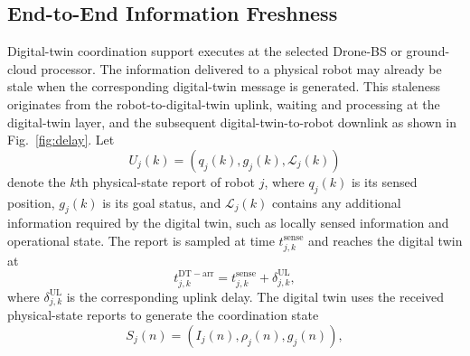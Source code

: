 \IfFileExists{IEEEtran.cls}{\documentclass[conference]{IEEEtran}}{\documentclass[10pt,twocolumn]{article}}
\begin{document}
\subsection{End-to-End Information Freshness} \label{subsec:end_to_end_information_freshness} Digital-twin coordination support executes at the selected Drone-BS or ground-cloud processor. The information delivered to a physical robot may already be stale when the corresponding digital-twin message is generated. This staleness originates from the robot-to-digital-twin uplink, waiting and processing at the digital-twin layer, and the subsequent digital-twin-to-robot downlink as shown in Fig.~\ref{fig:delay}. Let \begin{equation} U_j(k) = \left( q_j(k), g_j(k), \mathcal{L}_j(k) \right) \end{equation} denote the \(k\)th physical-state report of robot \(j\), where \(q_j(k)\) is its sensed position, \(g_j(k)\) is its goal status, and \(\mathcal{L}_j(k)\) contains any additional information required by the digital twin, such as locally sensed information and operational state. The report is sampled at time \(t_{j,k}^{\mathrm{sense}}\) and reaches the digital twin at
\begin{equation} t_{j,k}^{\mathrm{DT-arr}} = t_{j,k}^{\mathrm{sense}} + \delta_{j,k}^{\mathrm{UL}}, \label{eq:dt_uplink_arrival}
\end{equation}
where \(\delta_{j,k}^{\mathrm{UL}}\) is the corresponding uplink delay. The digital twin uses the received physical-state reports to generate the coordination state
\begin{equation} S_j(n) = \left( I_j(n), \rho_j(n), g_j(n) \right), \label{eq:coordination_state}
\end{equation}
\end{document}
